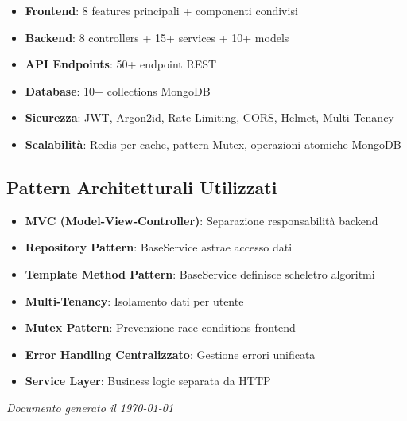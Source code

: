 \documentclass[11pt,a4paper]{article}
\begin{document}
\begin{itemize}
    \item \textbf{Frontend}: 8 features principali + componenti condivisi
    \item \textbf{Backend}: 8 controllers + 15+ services + 10+ models
    \item \textbf{API Endpoints}: 50+ endpoint REST
    \item \textbf{Database}: 10+ collections MongoDB
    \item \textbf{Sicurezza}: JWT, Argon2id, Rate Limiting, CORS, Helmet, Multi-Tenancy
    \item \textbf{Scalabilità}: Redis per cache, pattern Mutex, operazioni atomiche MongoDB
\end{itemize}

\subsection{Pattern Architetturali Utilizzati}

\begin{itemize}
    \item \textbf{MVC (Model-View-Controller)}: Separazione responsabilità backend
    \item \textbf{Repository Pattern}: BaseService astrae accesso dati
    \item \textbf{Template Method Pattern}: BaseService definisce scheletro algoritmi
    \item \textbf{Multi-Tenancy}: Isolamento dati per utente
    \item \textbf{Mutex Pattern}: Prevenzione race conditions frontend
    \item \textbf{Error Handling Centralizzato}: Gestione errori unificata
    \item \textbf{Service Layer}: Business logic separata da HTTP
\end{itemize}

\vspace{1cm}

\textit{Documento generato il \today}
\end{document}
